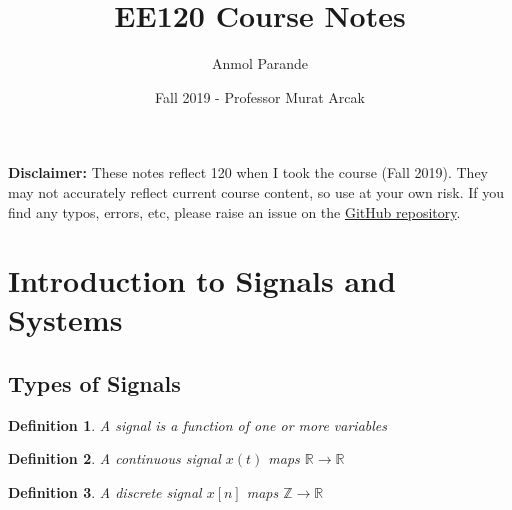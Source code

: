 \documentclass{article}
\newtheorem{definition}{Definition}
\begin{document}
\title{EE120 Course Notes}
\author{Anmol Parande}
\date{Fall 2019 - Professor Murat Arcak}
\maketitle
\textbf{Disclaimer: }These notes reflect 120 when I took the course (Fall 2019). They may not accurately reflect current course content, so use at your own risk.
If you find any typos, errors, etc, please raise an issue on the \href{https://github.com/parandea17/BerkeleyNotes}{GitHub repository}.\\
\tableofcontents
\newpage
\section{Introduction to Signals and Systems}
\subsection{Types of Signals}
\begin{definition}
    A signal is a function of one or more variables
\end{definition}
\begin{definition}
    A continuous signal $x(t)$ maps $\mathbb{R} \rightarrow \mathbb{R}$
\end{definition}
\begin{definition}
    A discrete signal $x[n]$ maps $\mathbb{Z} \rightarrow \mathbb{R}$
\end{definition}
\end{document}
